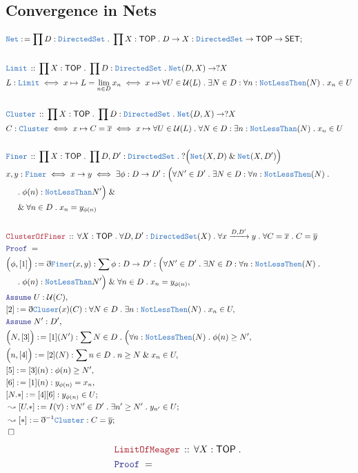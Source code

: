 \documentclass[12pt]{scrartcl}
\newcommand{\TYPE}[1]{\textcolor{NavyBlue}{\mathtt{#1}}}
\newcommand{\LOGIC}[1]{\textcolor{Blue}{\mathtt{#1}}}
\newcommand{\THM}[1]{\textcolor{Maroon}{\mathtt{#1}}}
\renewcommand{\.}{\; . \;}
\newcommand{\de}{: \kern 0.1pc =}
\newcommand{\Theorem}[2]{& \THM{#1} \, :: \, #2 \\ & \Proof = \\ }
\newcommand{\DeclareType}[2]{& \TYPE{#1} \, :: \, #2 \\}
\newcommand{\DefineNamedType}[4]{& #1 : \TYPE{#2} \iff #3 \iff #4 \\}
\newcommand{\NewLine}{\\ & \kern 1pc}
\newcommand{\Page}[1]{ \begin{align*} #1 \end{align*}   }
\newcommand{ \bd }{ \ByDef }
\renewcommand{\And}{\; \& \;}
\newcommand{\Arrow}{\xrightarrow}
\newcommand{\Say}[3]{& #1 \de #2 : #3, \\}
\newcommand{\Conclude}[3]{& #1 \de #2 : #3; \\}
\newcommand{\DeriveConclude}[3]{& \leadsto #1 \de #2 : #3 ; \\}
\newcommand{\Assume}[2]{& \LOGIC{Assume} \; #1 : #2, \\}
\newcommand{\QED}{\; \square}
\newcommand{\EndProof}{& \QED \\}
\newcommand{\ByDef}{\eth}
\newcommand{\Proof}{\LOGIC{Proof} \; }
\newcommand{\SET}{\mathsf{SET}}
\newcommand{\TOP}{\mathsf{TOP}}
\newcommand{\U}{\mathcal{U}}
\begin{document}
\subsection{Convergence in Nets}
\Page{
	\Conclude{\TYPE{Net}}{\prod D : \TYPE{DirectedSet} \. \prod X : \TOP \. D \to X }
	{
		\TYPE{DirectedSet} \to \TOP \to \SET
	}
	\\
	\DeclareType{Limit}{ \prod X : \TOP \. \prod D : \TYPE{DirectedSet} \. \TYPE{Net}(D,X) \to ?X}
	\DefineNamedType{L}{Limit}{ x \mapsto  L = \lim_{n \in D} x_n}
	{
		x \mapsto
		\forall U \in \U(L) \.
		\exists N \in D : 
		\forall n : \TYPE{NotLessThen}(N) \.
		x_n \in U
	}
	\\
	\DeclareType{Cluster}{ \prod X : \TOP \. \prod D : \TYPE{DirectedSet} \. \TYPE{Net}(D,X) \to ?X}
	\DefineNamedType{C}{Cluster}{ x \mapsto  C = \overline{x}}
	{
		x \mapsto
		\forall U \in \U(L) \.
		\forall N \in D : 
		\exists n : \TYPE{NotLessThan}(N) \.
		x_n \in U
	}
	\\
	\DeclareType{Finer}{
		\prod X : \TOP \. 
		\prod D,D' : \TYPE{DirectedSet}  \. 
		?\Big( \TYPE{Net}(X,D) \And \TYPE{Net}(X,D') \Big)
	}
	\DefineNamedType{x,y}{Finer}{x \to y}
	{
		\exists \phi : D \to D' : 
		\Big(\forall N' \in D' \. \exists N \in D : \forall n : \TYPE{NotLessThen}(N) \. \NewLine \.
			\phi(n) : \TYPE{NotLessThan} N'\Big) \And \NewLine \And 
		\forall n \in D \.  x_n = y_{\phi(n)} 
	}
	\\
	\Theorem{ClusterOfFiner}
	{
		\forall X : \TOP \.
		\forall D,D' : \TYPE{DirectedSet}(X) \.
		\forall  x \Arrow{D,D'} y \.
		\forall C = \overline{x} \.
		C = \overline{y}
	}
	\Say{\Big(\phi, [1] \Big)}{ \bd \TYPE{Finer}(x,y) }
	{
		\sum \phi : D \to D' : 
		\Big(\forall N' \in D' \. \exists N \in D : \forall n : \TYPE{NotLessThen}(N) \. \NewLine \.
			\phi(n) : \TYPE{NotLessThan} N'\Big) \And 
		\forall n \in D \.  x_n = y_{\phi(n)} 
	}
	\Assume{U}{\U(C)}
	\Say{[2]}{\bd \TYPE{Cluser}(x)(C) }
	{
		\forall N \in D \. \exists n : \TYPE{NotLessThen}(N) \. x_n \in U
	}
	\Assume{N'}{D'}
	\Say{\Big(N,[3]\Big)}{[1](N')}{
		\sum N \in D \.  \Big( 
		\forall n : \TYPE{NotLessThen}(N) \. 
		\phi(n) \ge N'
	}
	\Say{\Big(n,[4]\Big)}{[2](N)}
	{
		\sum n \in D \. n \ge N  \And x_n \in U
	}
	\Say{[5]}{[3](n)}{\phi(n) \ge N'}
	\Say{[6]}{[1](n)}{  y_{\phi(n)} = x_n   }
	\Conclude{[N.*]}{[4][6]}{  y_{\phi(n)} \in U  }
	\DeriveConclude{[U.*]}{ I(\forall) }{ 
		\forall N' \in D' \.
		\exists n' \ge N' \. y_{n'} \in U
	}
	\DeriveConclude{[*]}{\bd^{-1}\TYPE{Cluster}}{C = \overline{y}}
	\EndProof
}\Page{
	\Theorem{LimitOfMeager}
	{
		\forall X : \TOP \.
}}
\end{document}

